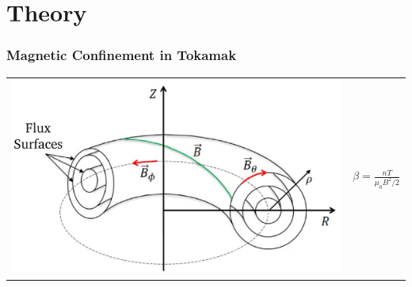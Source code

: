 \documentclass[compress,aspectratio=1610,noflama]{beamer}
\begin{document}
	\appendix

	\section*{Theory}

	\begin{frame}
		\frametitle{Magnetic Confinement in Tokamak}
		\begin{center}
			\begin{tabular}{>{\onslide<2->}c<{\onslide} >{\onslide<2->}c<{\onslide}}
				\includegraphics[width=0.6\paperwidth]{Theory/Tokamak-Torus.pdf} & $\beta = \frac{nT}{\mu_0 B^2/2}$
			\end{tabular}
		\end{center}
	\end{frame}
\end{document}
